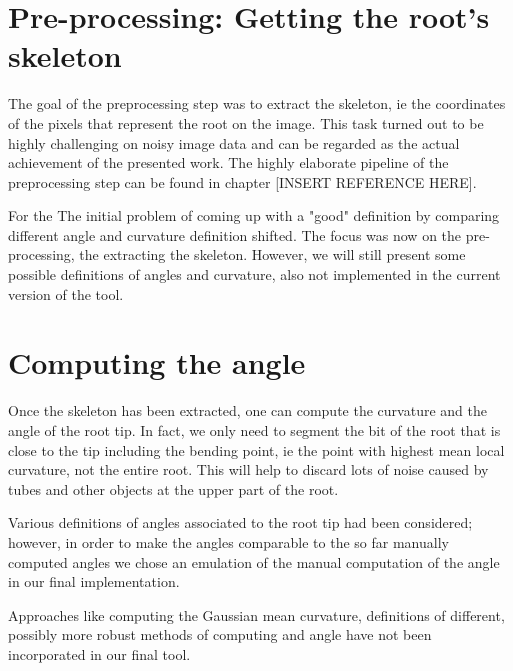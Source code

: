 \section{Pre-processing: Getting the root's skeleton}

The goal of the preprocessing step was to extract the skeleton, ie the coordinates of the pixels that represent the root on the image.
This task turned out to be highly challenging on noisy image data and can be regarded as the actual achievement of the presented work. The highly elaborate pipeline of the preprocessing step can be found in chapter [INSERT REFERENCE HERE].


For the
The initial problem of coming up with a "good" definition by comparing different angle and curvature definition shifted. The focus was now on the pre-processing, the extracting the skeleton. 
However, we will still present some possible definitions of angles and curvature, also not implemented in the current version of the tool.


\section{Computing the angle}

Once the skeleton has been extracted, one can compute the curvature and the angle of the root tip. 
In fact, we only need to segment the bit of the root that is close to the tip including the bending point, ie the point with highest mean local curvature, not the entire root. This will help to discard lots of noise caused by tubes and other objects at the upper part of the root.


Various definitions of angles associated to the root tip had been considered; however, in order to make the angles comparable to the so far manually computed angles we chose an emulation of the manual computation of the angle in our final implementation. 

Approaches like computing the Gaussian mean curvature, definitions of different, possibly more robust methods of computing and angle %
have not been incorporated in our final tool. 

